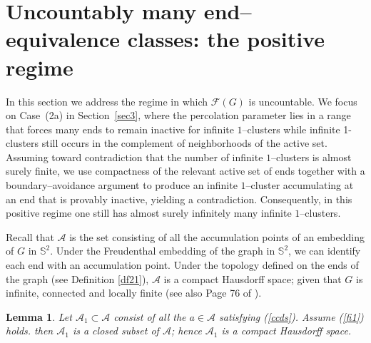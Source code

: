 \documentclass[11pt]{amsart}
\theoremstyle{plain}
\newtheorem{lemma}[theorem]{Lemma}
\numberwithin{equation}{section}
\numberwithin{figure}{section}
\begin{document}
\section{Uncountably many end--equivalence classes: the positive regime}
\label{s6}

In this section we address the regime in which $\mathcal F(G)$ is uncountable.
We focus on Case~(2a) in Section~\ref{sec3}, where the percolation parameter lies in a range that forces many ends to remain
inactive for infinite $1$--clusters while infinite 1-clusters still occurs in the complement of neighborhoods of the
active set.
Assuming toward contradiction that the number of infinite $1$--clusters is almost surely finite, we use
compactness of the relevant active set of ends together with a boundary--avoidance argument to produce
an infinite $1$--cluster accumulating at an end that is provably inactive, yielding a contradiction.
Consequently, in this positive regime one still has almost surely infinitely many infinite $1$--clusters.



Recall that $\mathcal{A}$ is the set consisting of all the accumulation points of an embedding of $G$ in $\mathbb{S}^2$. Under the Freudenthal embedding of the graph in $\mathbb{S}^2$, we can identify each end with an accumulation point.
Under the topology defined on the ends of the graph (see Definition \ref{df21}), $\mathcal{A}$ is a compact Hausdorff space; given that $G$ is infinite, connected and locally finite (see also Page 76 of \cite{bs96}).



\begin{lemma}\label{le78}Let $\mathcal{A}_1\subset \mathcal{A}$ consist of all the $a\in \mathcal{A}$ satisfying (\ref{ccds}).
Assume (\ref{fi1}) holds.
then $\mathcal{A}_1$ is a closed subset of $\mathcal{A}$; hence
$\mathcal{A}_1$ is a compact Hausdorff space.
\end{lemma}
\end{document}
